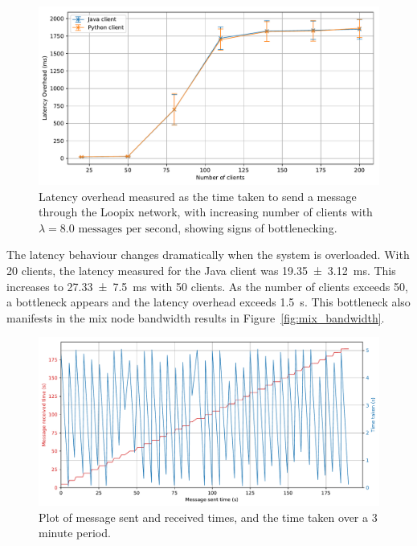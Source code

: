 \documentclass[final,dissertation.tex]{subfiles}
\begin{document}
\begin{figure}[h]
	\includegraphics[width=\linewidth]{../figs/client_latency_with_python_with_large_bottleneck}
	\caption{Latency overhead measured as the time taken to send a message through the Loopix network, with increasing number of clients with $\lambda = 8.0\text{ messages per second}$, showing signs of bottlenecking.}
	\label{fig:client_latency}
\end{figure}

The latency behaviour changes dramatically when the system is overloaded. With 20 clients, the latency measured for the Java client was \SI[separate-uncertainty=true]{19.35(312)}{\milli\second}. This increases to \SI[separate-uncertainty=true]{27.33(750)}{\milli\second} with 50 clients. As the number of clients exceeds 50, a bottleneck appears and the latency overhead exceeds \SI{1.5}{\second}. This bottleneck also manifests in the mix node bandwidth results in Figure~\ref{fig:mix_bandwidth}. 


\begin{figure}[h]
	\includegraphics[width=\linewidth]{../figs/client_total_latency_2}
	\caption{Plot of message sent and received times, and the time taken over a 3 minute period.}
	\label{fig:client_total_latency_2}
\end{figure}
\end{document}
